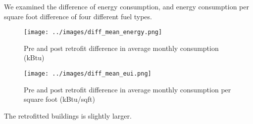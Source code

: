 \documentclass[12pt]{article}
\begin{document}
We examined the difference of energy consumption, and energy consumption per
square foot difference of four different fuel types.

\begin{figure}[H]
  \centering
  \texttt{[image: ../images/diff\_mean\_energy.png]}
  \caption[Energy trend retrofit study]{Pre and post retrofit difference in average monthly
    consumption (kBtu)}
  \label{fig:diff_mean_energy}
\end{figure}
\begin{figure}[H]
  \centering
  \texttt{[image: ../images/diff\_mean\_eui.png]}
  \caption[Energy trend retrofit study]{Pre and post retrofit difference in average monthly
    consumption per square foot (kBtu/sqft)}
  \label{fig:diff_mean_eui}
\end{figure}

The retrofitted buildings is slightly larger.
\end{document}

